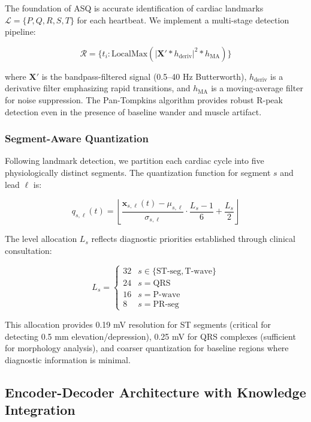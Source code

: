 \documentclass[journal]{IEEEtran}
\begin{document}
The foundation of ASQ is accurate identification of cardiac landmarks $\mathcal{L} = \{P, Q, R, S, T\}$ for each heartbeat. We implement a multi-stage detection pipeline:

\begin{equation}
\mathcal{R} = \{t_i : \text{LocalMax}(|\mathbf{X}' * h_{\text{deriv}}|^2 * h_{\text{MA}})\}
\end{equation}

where $\mathbf{X}'$ is the bandpass-filtered signal (0.5--40 Hz Butterworth), $h_{\text{deriv}}$ is a derivative filter emphasizing rapid transitions, and $h_{\text{MA}}$ is a moving-average filter for noise suppression. The Pan-Tompkins algorithm provides robust R-peak detection even in the presence of baseline wander and muscle artifact.

\subsubsection{Segment-Aware Quantization}

Following landmark detection, we partition each cardiac cycle into five physiologically distinct segments. The quantization function for segment $s$ and lead $\ell$ is:

\begin{equation}
q_{s,\ell}(t) = \left\lfloor \frac{\mathbf{x}_{s,\ell}(t) - \mu_{s,\ell}}{\sigma_{s,\ell}} \cdot \frac{L_s - 1}{6} + \frac{L_s}{2} \right\rfloor
\end{equation}

The level allocation $L_s$ reflects diagnostic priorities established through clinical consultation:

\begin{equation}
L_s = \begin{cases}
32 & s \in \{\text{ST-seg}, \text{T-wave}\} \\
24 & s = \text{QRS} \\
16 & s = \text{P-wave} \\
8 & s = \text{PR-seg}
\end{cases}
\end{equation}

This allocation provides 0.19 mV resolution for ST segments (critical for detecting 0.5 mm elevation/depression), 0.25 mV for QRS complexes (sufficient for morphology analysis), and coarser quantization for baseline regions where diagnostic information is minimal.

\subsection{Encoder-Decoder Architecture with Knowledge Integration}
\end{document}
